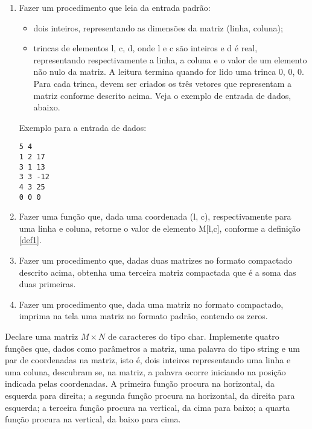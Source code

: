\begin {enumerate}


\item Fazer um procedimento que leia da entrada padrão: 
\begin{itemize}
\item dois inteiros, representando as dimensões da matriz (linha, coluna);
\item trincas de elementos l, c, d, onde l e c são inteiros e d é real,
representando respectivamente a linha, a coluna
e o valor de um elemento não nulo da matriz. A leitura termina quando for
lido uma trinca 0, 0, 0. Para cada trinca, devem ser criados os três
vetores que representam a matriz conforme descrito acima. Veja o exemplo
de entrada de dados, abaixo.
\end{itemize}

Exemplo para a entrada de dados:

\begin{verbatim}
5 4
1 2 17
3 1 13
3 3 -12
4 3 25
0 0 0 
\end{verbatim}


\item Fazer uma função que, dada uma coordenada (l, c), respectivamente
para uma linha e coluna,
retorne o valor de elemento M[l,c], conforme a definição \ref{def1}.

\item Fazer um procedimento que,  dadas duas matrizes no formato compactado
descrito acima, obtenha uma terceira matriz compactada que é a soma
das duas primeiras. 

\item Fazer um procedimento que, dada uma matriz no formato compactado,
imprima na tela uma matriz no formato padrão, contendo os zeros.

\end{enumerate}




\item Declare uma matriz $M \times N$ de caracteres do
  tipo \textsf{char}.  Implemente quatro funções que, dados como
  parâmetros a matriz, uma palavra do tipo \textsf{string} e um par de
  coordenadas na matriz, isto é, dois inteiros representando uma linha e
  uma coluna,  descubram se,  na matriz, a  palavra ocorre  iniciando na
  posição indicada pelas coordenadas. 
A primeira função procura na horizontal, da esquerda para direita;
a segunda função procura na horizontal, da direita para esquerda;
a terceira função procura na vertical, da cima para baixo;
a quarta função procura na vertical, da baixo para cima.




